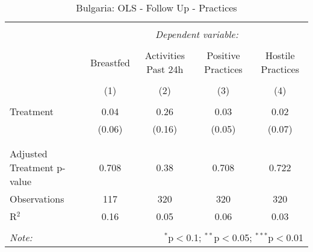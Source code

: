 
\begin{table}[!htbp] \centering 
  \caption{Bulgaria: OLS - Follow Up - Practices} 
  \label{tbl:Bulgaria: OLS - Follow Up - Practices} 
\begin{tabular}{@{\extracolsep{5pt}}lcccc} 
\\[-1.8ex]\hline 
\hline \\[-1.8ex] 
 & \multicolumn{4}{c}{\textit{Dependent variable:}} \\ 
\cline{2-5} 
\\[-1.8ex] & Breastfed & Activities Past 24h & Positive Practices & Hostile Practices \\ 
\\[-1.8ex] & (1) & (2) & (3) & (4)\\ 
\hline \\[-1.8ex] 
 Treatment & 0.04 & 0.26 & 0.03 & 0.02 \\ 
  & (0.06) & (0.16) & (0.05) & (0.07) \\ 
  & & & & \\ 
\hline \\[-1.8ex] 
Adjusted Treatment p-value & 0.708 & 0.38 & 0.708 & 0.722 \\ 
Observations & 117 & 320 & 320 & 320 \\ 
R$^{2}$ & 0.16 & 0.05 & 0.06 & 0.03 \\ 
\hline 
\hline \\[-1.8ex] 
\textit{Note:}  & \multicolumn{4}{r}{$^{*}$p$<$0.1; $^{**}$p$<$0.05; $^{***}$p$<$0.01} \\ 
\end{tabular} 
\end{table} 
